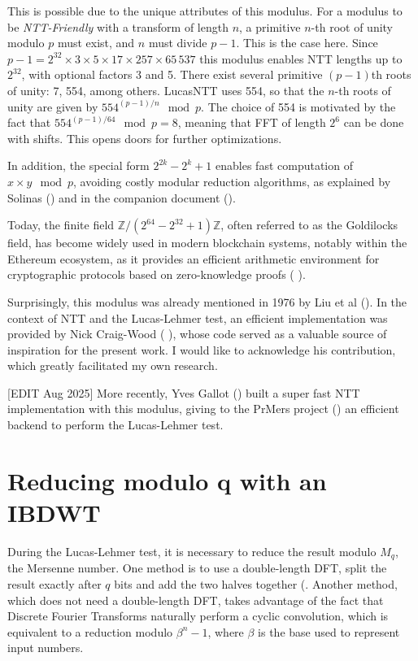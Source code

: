 \documentclass{article}
\begin{document}
This is possible due to the unique attributes of this modulus. For a modulus to be \emph{NTT-Friendly} with a transform of length $n$, a primitive $n$-th root of unity modulo $p$ must exist, and $n$ must divide $p-1$. This is the case here. Since $p-1 = 2^{32} \times 3 \times 5 \times 17 \times 257 \times 65\,537$ this modulus enables NTT lengths up to $2^{32}$, with optional factors 3 and 5. There exist several primitive $(p-1)$th roots of unity: 7, 554, among others. LucasNTT uses 554, so that the $n$-th roots of unity are given by $554^{(p-1)/n} \mod p$. The choice of 554 is motivated by the fact that $554^{(p-1)/64} \mod p = 8$, meaning that FFT of length $2^6$ can be done with shifts. This opens doors for further optimizations.

In addition, the special form $2^{2k} - 2^k + 1$ enables fast computation of $x\times y \mod p$, avoiding costly modular reduction algorithms, as explained by Solinas (\cite{Sol99}) and in the companion document (\cite{LucasNTT_documents}).

Today, the finite field $\mathbb{Z}/(2^{64} - 2^{32} + 1)\mathbb{Z}$, often referred to as the Goldilocks field, has become widely used in modern blockchain systems, notably within the Ethereum ecosystem, as it provides an efficient arithmetic environment for cryptographic protocols based on zero-knowledge proofs (\cite{zk1} \cite{zk2} \cite{zk3}).
 
Surprisingly, this modulus was already mentioned in 1976 by Liu et al (\cite{LRT76}). In the context of NTT and the Lucas-Lehmer test, an efficient implementation was provided by Nick Craig-Wood (\cite{ncw94} \cite{ncw14}), whose code served as a valuable source of inspiration for the present work. I would like to acknowledge his contribution, which greatly facilitated my own research.

[EDIT Aug 2025] More recently, Yves Gallot (\cite{marin_github}) built a super fast NTT implementation with this modulus, giving to the PrMers project (\cite{prmers_github}) an efficient backend to perform the Lucas-Lehmer test. 

\section{Reducing modulo q with an IBDWT}

During the Lucas-Lehmer test, it is necessary to reduce the result modulo $M_q$, the Mersenne number. One method is to use a double-length DFT, split the result exactly after $q$ bits and add the two halves together (\cite{Sol99}. Another method, which does not need a double-length DFT, takes advantage of the fact that Discrete Fourier Transforms naturally perform a cyclic convolution, which is equivalent to a reduction modulo $\beta^n - 1$, where $\beta$ is the base used to represent input numbers.
\end{document}
